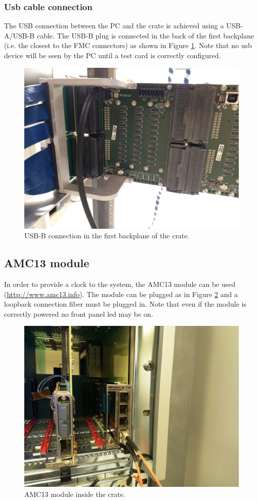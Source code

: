 \documentclass[10pt,a4paper]{article}
\begin{document}
\subsubsection{Usb cable connection}
The USB connection between the PC and the crate is achieved using a USB-A/USB-B cable. The USB-B plug is connected in the back of the first backplane (i.e. the closest to the FMC connectors) as shown in Figure \ref{USBBCrate}. 
Note that no usb device will be seen by the PC until a test card is correctly configured.

\begin{figure}[h!]
\centering
 \includegraphics[width=0.8\linewidth]{USBBCrate.jpeg} 
  \caption{USB-B connection in the first backplane of the crate.}
  \label{USBBCrate}
\end{figure}

\subsection{AMC13 module}
In order to provide a clock to the system, the AMC13 module can be used (\url{http://www.amc13.info}). The module can be plugged as in Figure \ref{amc13} and a loopback connection fiber must be plugged in. Note that even if the module is correctly powered no front panel led may be on.
\begin{figure}[h!]
\centering
 \includegraphics[width=0.8\linewidth]{amc13.jpg} 
  \caption{AMC13 module inside the crate.}
  \label{amc13}
\end{figure}
\end{document}

